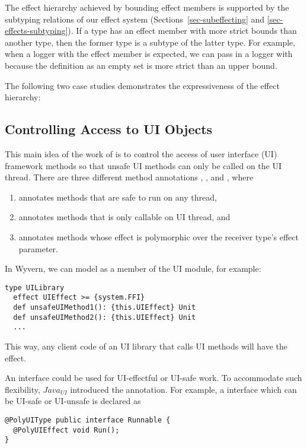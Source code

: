 The effect hierarchy achieved by bounding effect members is supported by the subtyping relations of our effect system (Sections~\ref{sec-subeffecting} and \ref{sec-effects-subtyping}). If a type has an effect member with more strict bounds than another type, then the former type is a subtype of the latter type. For example, when a logger with the effect member  is expected, we can pass in a logger with  because the definition as an empty set is more strict than an upper bound.

The following two case studies  demonstrates the expressiveness of the effect hierarchy:

\subsection{Controlling Access to UI Objects}

This main idea of the work of \citet{gordon13} is to control the access of user interface (UI) framework methods so that unsafe UI methods can only be called on the UI thread. There are three different method annotations , , and , where
\begin{enumerate}
    \item {} annotates methods that are safe to run on any thread,
    \item {} annotates methods that is only callable on UI thread, and
    \item {} annotates methods whose effect is polymorphic over the receiver type's effect parameter.
\end{enumerate}

In Wyvern, we can model  as a member of the UI module, for example:
\begin{lstlisting}[numbers=none]
type UILibrary
  effect UIEffect >= {system.FFI}
  def unsafeUIMethod1(): {this.UIEffect} Unit
  def unsafeUIMethod2(): {this.UIEffect} Unit
  ...
\end{lstlisting}
This way, any client code of an UI library that calls UI methods will have the  effect.

An interface could be used for UI-effectful or UI-safe work. To accommodate such flexibility, $\mathit{Java}_{\mathit{UI}}$ introduced the  annotation. For example, a  interface which can be UI-safe or UI-unsafe is declared as
\begin{lstlisting}[numbers=none]
@PolyUIType public interface Runnable {
  @PolyUIEffect void Run();
}
\end{lstlisting}

